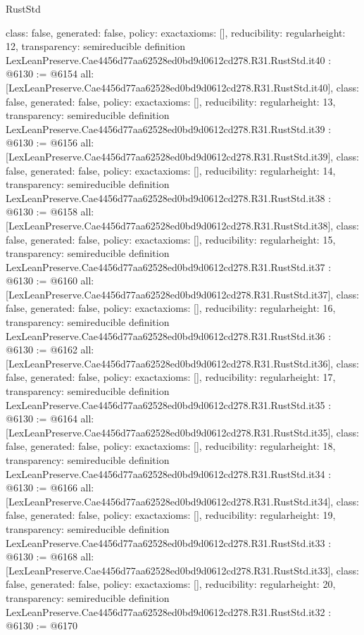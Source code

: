 \begin{lexlean}{RustStd}
\begin{coremodule}
{  class: false,
  generated: false,
  policy: exact{axioms: []},
  reducibility: regular{height: 12},
  transparency: semireducible
}
definition LexLeanPreserve.Cae4456d77aa62528ed0bd9d0612cd278.R31.RustStd.it40 : @6130 := @6154 {
  all: [LexLeanPreserve.Cae4456d77aa62528ed0bd9d0612cd278.R31.RustStd.it40],
  class: false,
  generated: false,
  policy: exact{axioms: []},
  reducibility: regular{height: 13},
  transparency: semireducible
}
definition LexLeanPreserve.Cae4456d77aa62528ed0bd9d0612cd278.R31.RustStd.it39 : @6130 := @6156 {
  all: [LexLeanPreserve.Cae4456d77aa62528ed0bd9d0612cd278.R31.RustStd.it39],
  class: false,
  generated: false,
  policy: exact{axioms: []},
  reducibility: regular{height: 14},
  transparency: semireducible
}
definition LexLeanPreserve.Cae4456d77aa62528ed0bd9d0612cd278.R31.RustStd.it38 : @6130 := @6158 {
  all: [LexLeanPreserve.Cae4456d77aa62528ed0bd9d0612cd278.R31.RustStd.it38],
  class: false,
  generated: false,
  policy: exact{axioms: []},
  reducibility: regular{height: 15},
  transparency: semireducible
}
definition LexLeanPreserve.Cae4456d77aa62528ed0bd9d0612cd278.R31.RustStd.it37 : @6130 := @6160 {
  all: [LexLeanPreserve.Cae4456d77aa62528ed0bd9d0612cd278.R31.RustStd.it37],
  class: false,
  generated: false,
  policy: exact{axioms: []},
  reducibility: regular{height: 16},
  transparency: semireducible
}
definition LexLeanPreserve.Cae4456d77aa62528ed0bd9d0612cd278.R31.RustStd.it36 : @6130 := @6162 {
  all: [LexLeanPreserve.Cae4456d77aa62528ed0bd9d0612cd278.R31.RustStd.it36],
  class: false,
  generated: false,
  policy: exact{axioms: []},
  reducibility: regular{height: 17},
  transparency: semireducible
}
definition LexLeanPreserve.Cae4456d77aa62528ed0bd9d0612cd278.R31.RustStd.it35 : @6130 := @6164 {
  all: [LexLeanPreserve.Cae4456d77aa62528ed0bd9d0612cd278.R31.RustStd.it35],
  class: false,
  generated: false,
  policy: exact{axioms: []},
  reducibility: regular{height: 18},
  transparency: semireducible
}
definition LexLeanPreserve.Cae4456d77aa62528ed0bd9d0612cd278.R31.RustStd.it34 : @6130 := @6166 {
  all: [LexLeanPreserve.Cae4456d77aa62528ed0bd9d0612cd278.R31.RustStd.it34],
  class: false,
  generated: false,
  policy: exact{axioms: []},
  reducibility: regular{height: 19},
  transparency: semireducible
}
definition LexLeanPreserve.Cae4456d77aa62528ed0bd9d0612cd278.R31.RustStd.it33 : @6130 := @6168 {
  all: [LexLeanPreserve.Cae4456d77aa62528ed0bd9d0612cd278.R31.RustStd.it33],
  class: false,
  generated: false,
  policy: exact{axioms: []},
  reducibility: regular{height: 20},
  transparency: semireducible
}
definition LexLeanPreserve.Cae4456d77aa62528ed0bd9d0612cd278.R31.RustStd.it32 : @6130 := @6170 {
}
\end{coremodule}
\end{lexlean}
